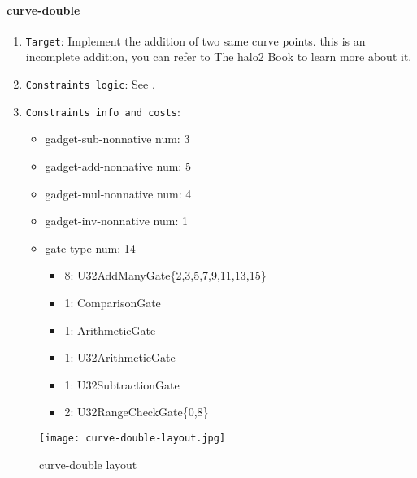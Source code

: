 \paragraph{curve-double}

\begin{enumerate}
    \item \verb|Target|: Implement the addition of two same curve points. this is an incomplete addition, you can refer to The halo2 Book \cite{website:halo2-book} to learn more about it.
    \item \verb|Constraints logic|: See .
    \item \verb|Constraints info and costs|:
    \begin{itemize}
        \item gadget-sub-nonnative num: 3
        \item gadget-add-nonnative num: 5
        \item gadget-mul-nonnative num: 4
        \item gadget-inv-nonnative num: 1
        \item gate type num: 14
            \begin{itemize}
                \item 8: U32AddManyGate\{2,3,5,7,9,11,13,15\}
                \item 1: ComparisonGate
                \item 1: ArithmeticGate
                \item 1: U32ArithmeticGate
                \item 1: U32SubtractionGate
                \item 2: U32RangeCheckGate\{0,8\}
            \end{itemize}
    \end{itemize}
\end{enumerate}

\begin{figure}[!ht]
    \centering
    \texttt{[image: curve-double-layout.jpg]}
    \caption{curve-double layout}
    \label{fig:curve-double-layout}
\end{figure}
